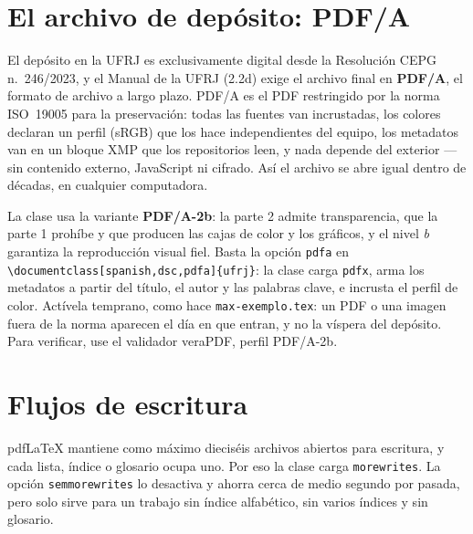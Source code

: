 \documentclass[spanish,dsc]{ufrj}
\begin{document}
  \section{El archivo de depósito: PDF/A}
  El depósito en la UFRJ es exclusivamente digital desde la Resolución CEPG
  n.~246/2023, y el Manual de la UFRJ (2.2d) exige el archivo final en
  \textbf{PDF/A}, el formato de archivo a largo plazo. PDF/A es el PDF
  restringido por la norma ISO~19005 para la preservación: todas las fuentes van
  incrustadas, los colores declaran un perfil (sRGB) que los hace independientes
  del equipo, los metadatos van en un bloque XMP que los repositorios leen, y
  nada depende del exterior --- sin contenido externo, JavaScript ni cifrado.
  Así el archivo se abre igual dentro de décadas, en cualquier computadora.

  La clase usa la variante \textbf{PDF/A-2b}: la parte 2 admite transparencia,
  que la parte 1 prohíbe y que producen las cajas de color y los gráficos, y el
  nivel \emph{b} garantiza la reproducción visual fiel. Basta la opción
  \texttt{pdfa} en \verb|\documentclass[spanish,dsc,pdfa]{ufrj}|: la clase carga
  \texttt{pdfx}, arma los metadatos a partir del título, el autor y las palabras
  clave, e incrusta el perfil de color. Actívela temprano, como hace
  \texttt{max-exemplo.tex}: un PDF o una imagen fuera de la norma aparecen el día en
  que entran, y no la víspera del depósito. Para verificar, use el validador
  veraPDF, perfil PDF/A-2b.

  \section{Flujos de escritura}
  pdf\LaTeX{} mantiene como máximo dieciséis archivos abiertos para escritura,
  y cada lista, índice o glosario ocupa uno. Por eso la clase carga
  \texttt{morewrites}. La opción \texttt{semmorewrites} lo desactiva y ahorra
  cerca de medio segundo por pasada, pero solo sirve para un trabajo sin índice
  alfabético, sin varios índices y sin glosario.
\end{document}
